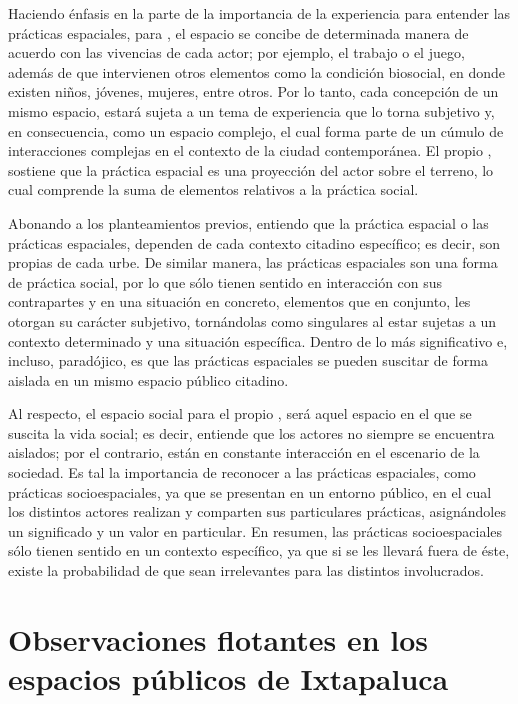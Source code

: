\documentclass[
  spanish,
  11pt,
  a4paper,
]{scrbook}
\begin{document}
Haciendo énfasis en la parte de la importancia de la experiencia para
entender las prácticas espaciales, para \textcite{Lefebvre2013}, el
espacio se concibe de determinada manera de acuerdo con las vivencias de
cada actor; por ejemplo, el trabajo o el juego, además de que
intervienen otros elementos como la condición biosocial, en donde
existen niños, jóvenes, mujeres, entre otros. Por lo tanto, cada
concepción de un mismo espacio, estará sujeta a un tema de experiencia
que lo torna subjetivo y, en consecuencia, como un espacio complejo, el
cual forma parte de un cúmulo de interacciones complejas en el contexto
de la ciudad contemporánea. El propio \textcite{Lefebvre2013}, sostiene
que la práctica espacial es una proyección del actor sobre el terreno,
lo cual comprende la suma de elementos relativos a la práctica social.

Abonando a los planteamientos previos, entiendo que la práctica espacial
o las prácticas espaciales, dependen de cada contexto citadino
específico; es decir, son propias de cada urbe. De similar manera, las
prácticas espaciales son una forma de práctica social, por lo que sólo
tienen sentido en interacción con sus contrapartes y en una situación en
concreto, elementos que en conjunto, les otorgan su carácter subjetivo,
tornándolas como singulares al estar sujetas a un contexto determinado y
una situación específica. Dentro de lo más significativo e, incluso,
paradójico, es que las prácticas espaciales se pueden suscitar de forma
aislada en un mismo espacio público citadino.

Al respecto, el espacio social para el propio \textcite{Lefebvre2013},
será aquel espacio en el que se suscita la vida social; es decir,
entiende que los actores no siempre se encuentra aislados; por el
contrario, están en constante interacción en el escenario de la
sociedad. Es tal la importancia de reconocer a las prácticas espaciales,
como prácticas socioespaciales, ya que se presentan en un entorno
público, en el cual los distintos actores realizan y comparten sus
particulares prácticas, asignándoles un significado y un valor en
particular. En resumen, las prácticas socioespaciales sólo tienen
sentido en un contexto específico, ya que si se les llevará fuera de
éste, existe la probabilidad de que sean irrelevantes para las distintos
involucrados.

\section*{Observaciones flotantes en los espacios públicos de
Ixtapaluca}\label{observaciones-flotantes-en-los-espacios-puxfablicos-de-ixtapaluca}
\end{document}
